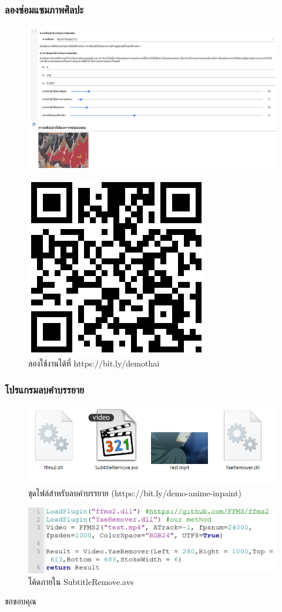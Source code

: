 \documentclass[xcolor=dvipsnames, xetex,serif]{beamer}
\begin{document}
    \begin{frame}
        \frametitle{ลองซ่อมแซมภาพศิลปะ}
        \centering
        \begin{figure}[H]
            \centering
            \includegraphics[width=0.7\linewidth]{images/colab_sample.png}
        \end{figure}
        \begin{figure}[H]
            \centering
            \includegraphics[width=0.1\linewidth]{images/colab_qr.png}
            \caption{ลองใช้งานได้ที่ https://bit.ly/demothai}
        \end{figure}
    \end{frame}
    \begin{frame}
		\frametitle{โปรแกรมลบคำบรรยาย}
		\begin{figure}
			\includegraphics[width=0.8\linewidth]{images/demo_anime/file.png}
			\caption{ชุดไฟล์สำหรับลบคำบรรยาย (https://bit.ly/demo-anime-inpaint)}
		\end{figure}
		\begin{figure}
			\includegraphics[width=0.8\linewidth]{images/demo_anime/notepad.png}
			\caption{โค้ดภายใน SubtitleRemove.avs}
		\end{figure}
	\end{frame}
    \begin{frame}
        \centering
        \Huge{ขอขอบคุณ}
    \end{frame}
\end{document}
